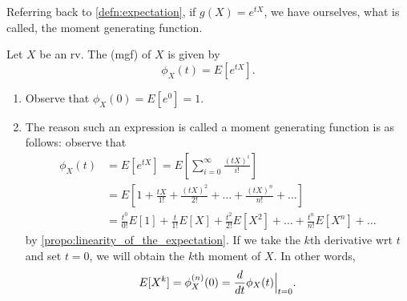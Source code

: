 \documentclass[notoc,notitlepage]{tufte-book}
\begin{document}
Referring back to \cref{defn:expectation}, if $g(X) = e^{tX}$, we have ourselves, what is called, the moment generating function.

\begin{defn}
\label{defn:moment_generating_function}
  Let $X$ be an rv. The  (mgf) of $X$ is given by
  \begin{equation*}
    \phi_X(t) = E\left[ e^{tX} \right].
  \end{equation*}
\end{defn}

\begin{note}
  \begin{enumerate}
    \item Observe that $\phi_X(0) = E\left[ e^0 \right] = 1$.
    \item The reason such an expression is called a moment generating function is as follows: observe that
      \begin{align*}
        \phi_X(t) &= E\left[ e^{tX} \right] = E\left[ \sum_{i=0}^{\infty} \frac{(tX)^i}{i!} \right] \\
                  &= E\left[ 1 + \frac{tX}{1!} + \frac{(tX)^2}{2!} + \hdots + \frac{(tX)^n}{n!} + \hdots \right] \\
                  &= \frac{t^0}{0!} E[1] + \frac{t}{1!} E[X] + \frac{t^2}{2!} E\left[X^2\right] + \hdots + \frac{t^n}{n!} E\left[X^n\right] + \hdots
      \end{align*}
      by \cref{propo:linearity_of_the_expectation}. If we take the $k$th derivative wrt $t$ and set $t = 0$, we will obtain the $k$th moment of $X$. In other words,
      \begin{equation*}
        E[X^k] = \phi_X^{(n)}(0) = \frac{d}{dt} \phi_X (t) \Big|_{t = 0}^{}.
      \end{equation*}
  \end{enumerate}
\end{note}



\appendix

\backmatter

\pagestyle{plain}

\nobibliography*


\printindex
\end{document}
